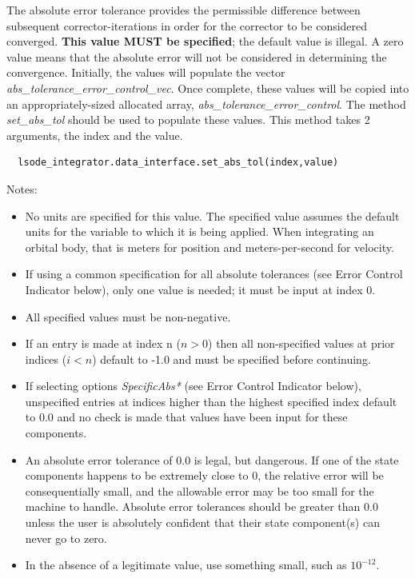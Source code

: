 The absolute error tolerance provides the permissible difference between
subsequent corrector-iterations in order for the corrector to be considered
converged.  \textbf{This value MUST be specified}; the default value is
illegal.  A zero value means that the absolute error will not be considered in
determining the convergence.
Initially, the values will populate the vector
\textit{abs\_tolerance\_error\_control\_vec}.
 Once complete, these values will be copied into an appropriately-sized
allocated array, \newline \textit{abs\_tolerance\_error\_control}.
The method \textit{set\_abs\_tol} should be used to populate these values.
This method takes 2 arguments, the index and the value.
\begin{verbatim}
  lsode_integrator.data_interface.set_abs_tol(index,value)
\end{verbatim}
Notes:
\begin{itemize}
\item
No units are specified for this value.  The specified value assumes the
default units for the variable to which it is being applied.  When
integrating an orbital body, that is meters for position and
meters-per-second for velocity.
\item
If using a common specification for all absolute tolerances (see Error
Control Indicator below), only one
value is needed; it must be input at index 0.
\item
All specified values must be non-negative.
\item
If an entry is made at index n ($n>0$) then all non-specified values at prior
indices ($i<n$) default to -1.0 and must be specified before continuing.
\item
If selecting options \textit{SpecificAbs*} (see Error Control Indicator
below), unspecified entries at indices higher
than the highest specified index default to 0.0 and no check is made that
values have been input for these components.
\item
An absolute error tolerance of 0.0 is legal, but dangerous.  If one of
the state components happens to be extremely close to 0, the relative
error will be consequentially small, and the allowable error may be too
small for the machine to handle.  Absolute error tolerances should be
greater than 0.0 unless the user is absolutely confident that their state
component(s) can never go to zero.
\item
In the absence of a legitimate value, use something small, such as
$10^{-12}$.
\end{itemize}



